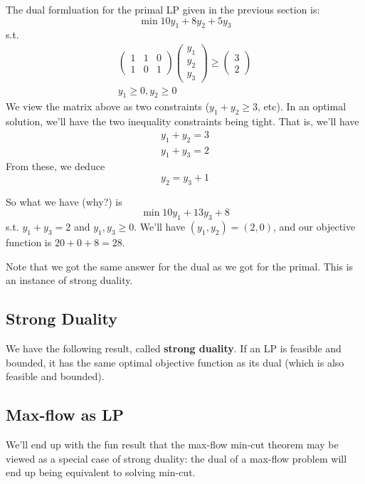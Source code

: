 \documentclass{article}
\begin{document}
The dual formluation for the primal LP given in the previous section is:
$$
\min 10 y_1 + 8y_2 + 5y_3
$$
s.t.
\begin{align}
\begin{pmatrix}
1 & 1 & 0 \\
1 & 0 & 1
\end{pmatrix}
\begin{pmatrix}
y_1 \\ y_2 \\ y_3
\end{pmatrix}
\geq
\begin{pmatrix}
3 \\ 2
\end{pmatrix}
\\
y_1 \geq 0, y_2 \geq 0
\end{align}
We view the matrix above as two constraints ($y_1 + y_2 \geq 3$, etc).
In an optimal solution, we'll have the two inequality constraints being
tight.
That is, we'll have 
\begin{align*}
y_1 + y_2 = 3 \\
y_1 + y_3 = 2
\end{align*}
From these, we deduce
$$
y_2 = y_3 + 1
$$

So what we have (why?) is
$$
\min 10 y_1 + 13 y_3 + 8
$$
s.t. $y_1 + y_3 = 2$ and $y_1 , y_3 \geq 0$.
We'll have $(y_1, y_2) = (2,0)$, and our objective
function is $20 + 0 + 8 = 28$.

Note that we got the same answer for the dual as we got for the primal.
This is an instance of strong duality.

\subsection{Strong Duality}

We have the following result, called \textbf{strong duality}.
If an LP is feasible and bounded, it has the same optimal objective
function as its dual (which is also feasible and bounded).

\subsection{Max-flow as LP}

We'll end up with the fun result that the max-flow min-cut theorem may
be viewed as a special case of strong duality: the dual of a max-flow
problem will end up being equivalent to solving min-cut.
\end{document}
